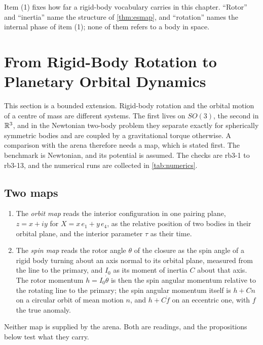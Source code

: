 Item (1) fixes how far a rigid-body vocabulary carries in this chapter. ``Rotor'' and ``inertia'' name the structure of \cref{thm:esmap}, and
``rotation'' names the internal phase of item (1); none of them refers to a body in space.

\section{From Rigid-Body Rotation to Planetary Orbital Dynamics}
\label{sec:orbital}

This section is a bounded extension. Rigid-body rotation and the orbital motion of a centre of mass are different systems. The first lives on
$SO(3)$, the second in $\mathbb{R}^3$, and in the Newtonian two-body problem they separate exactly for spherically symmetric bodies and are coupled by a
gravitational torque otherwise. A comparison with the arena therefore needs a map, which is stated first. The benchmark is Newtonian, and its
potential is assumed. The checks are rb3-1 to rb3-13, and the numerical runs are collected in \cref{tab:numerics}.

\subsection{Two maps}
\label{sec:orbital:maps}

\begin{definition}
\label{def:orbitmaps}
\begin{enumerate}[label=(\roman*),leftmargin=2.2em]
\item The \emph{orbit map} reads the interior configuration in one pairing plane, $z=x+iy$ for $X=x\,e_1+y\,e_4$, as the relative position of
two bodies in their orbital plane, and the interior parameter $\tau$ as their time.
\item The \emph{spin map} reads the rotor angle $\theta$ of the closure as the spin angle of a rigid body turning about an axis normal to its
orbital plane, measured from the line to the primary, and $I_0$ as its moment of inertia $C$ about that axis. The rotor momentum $h=I_0\dot\theta$
is then the spin angular momentum relative to the rotating line to the primary; the spin angular momentum itself is $h+Cn$ on a circular
orbit of mean motion $n$, and $h+C\dot f$ on an eccentric one, with $f$ the true anomaly.
\end{enumerate}
\end{definition}

Neither map is supplied by the arena. Both are readings, and the propositions below test what they carry.


